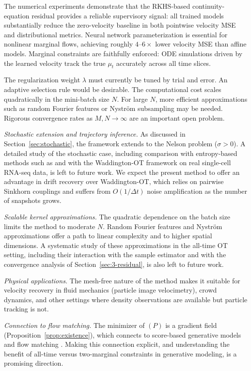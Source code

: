 \documentclass[11pt,leqno]{article}
\theoremstyle{plain}
\theoremstyle{remark}
\theoremstyle{definition}
\numberwithin{equation}{section}
\numberwithin{figure}{section}
\numberwithin{table}{section}
\begin{document}
The numerical experiments demonstrate that the RKHS-based
continuity-equation residual provides a reliable supervisory signal:
all trained models substantially reduce the zero-velocity baseline in
both pointwise velocity MSE and distributional metrics.
Neural network parameterization is essential for nonlinear marginal flows,
achieving roughly $4$--$6\times$ lower velocity MSE than affine models.
Marginal constraints are faithfully enforced: ODE simulations driven by the
learned velocity track the true $\mu_t$ accurately across all time slices.


The regularization weight $\lambda$ must currently be tuned by trial
and error. An adaptive selection rule would be desirable.
The computational cost scales quadratically in the mini-batch size
$N$. For large $N$, more efficient approximations such as random
Fourier features \cite{Scholkopf2002} or Nystr\"om subsampling may be
needed.
Rigorous convergence rates as $M,N\to\infty$ are an important open
problem.


\emph{Stochastic extension and trajectory inference.}
As discussed in Section~\ref{sec:stochastic}, the framework extends to
the Nelson problem ($\sigma>0$).
A detailed study of the stochastic case, including comparison with
entropy-based methods such as \cite{lav:2024} and with the
Waddington-OT framework \cite{Schiebinger2019} on real single-cell
RNA-seq data, is left to future work. We expect the present method
to offer an advantage in drift recovery over Waddington-OT, which
relies on pairwise Sinkhorn couplings and suffers from
$O(1/\Delta t)$ noise amplification as the number of snapshots grows.

\emph{Scalable kernel approximations.}
The quadratic dependence on the batch size limits the method to
moderate $N$. Random Fourier features and Nystr\"om approximations
offer a path to linear complexity and to higher spatial dimensions.
A systematic study of these approximations in the all-time OT
setting, including their interaction with the sample estimator
and with the convergence analysis of Section~\ref{sec:3-residual},
is also left to future work.

\emph{Physical applications.}
The mesh-free nature of the method makes it suitable for velocity recovery
in fluid mechanics (particle image velocimetry), crowd dynamics, and other
settings where density observations are available but particle tracking is not. 

\emph{Connection to flow matching.}
The minimizer of $(P)$ is a gradient field (Proposition~\ref{prop:existence}),
which connects to score-based generative models \cite{Song2021} and flow
matching \cite{Lipman2023,Albergo2023,Tong2024}.
Making this connection explicit, and understanding the benefit of all-time
versus two-marginal constraints in generative modeling, is a promising direction. 
\end{document}
